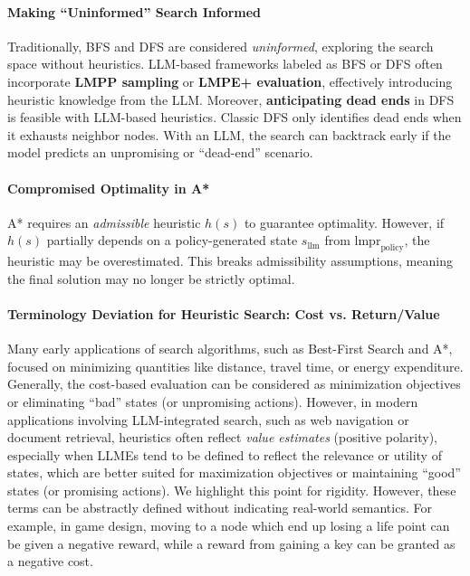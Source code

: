 \paragraph{Making ``Uninformed'' Search Informed}
Traditionally, BFS and DFS are considered \emph{uninformed}, exploring the search space without heuristics. LLM-based frameworks labeled as BFS or DFS often incorporate \textbf{LMPP sampling} or \textbf{LMPE+ evaluation}, effectively introducing heuristic knowledge from the LLM.
Moreover, \textbf{anticipating dead ends} in DFS is feasible with LLM-based heuristics. Classic DFS only identifies dead ends when it exhausts neighbor nodes. With an LLM, the search can backtrack early if the model predicts an unpromising or “dead-end” scenario.

\paragraph{Compromised Optimality in A*}
A* requires an \emph{admissible} heuristic \(h(s)\) to guarantee optimality. However, if \(h(s)\) partially depends on a policy-generated state \(s_\text{llm}\) from \(\text{lmpr}_\text{policy}\), the heuristic may be overestimated. This breaks admissibility assumptions, meaning the final solution may no longer be strictly optimal.

\paragraph{Terminology Deviation for Heuristic Search: Cost vs. Return/Value}
Many early applications of search algorithms, such as Best-First Search and A*, focused on minimizing quantities like distance, travel time, or energy expenditure. Generally, the cost-based evaluation can be considered as minimization objectives or eliminating ``bad'' states (or unpromising actions).
However, in modern applications involving LLM-integrated search, such as web navigation or document retrieval, heuristics often reflect \textit{value estimates} (positive polarity), especially when LLMEs tend to be defined to reflect the relevance or utility of states, which are better suited for maximization objectives or maintaining ``good'' states (or promising actions).
We highlight this point for rigidity. However, these terms can be abstractly defined without indicating real-world semantics. For example, in game design, moving to a node which end up losing a life point can be given a negative reward, while a reward from gaining a key can be granted as a negative cost.

